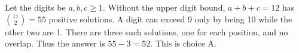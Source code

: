 Let the digits be $a,b,c\ge1$. Without the upper digit bound, $a+b+c=12$ has $\binom{11}{2}=55$ positive solutions. A digit can exceed 9 only by being 10 while the other two are 1. There are three such solutions, one for each position, and no overlap. Thus the answer is $55-3=\boxed{52}$. This is choice A.
